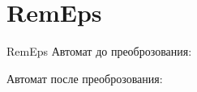 \section{RemEps}
\begin{frame}{RemEps}
	Автомат до преоброзования:


	Автомат после преоброзования:

\end{frame}
